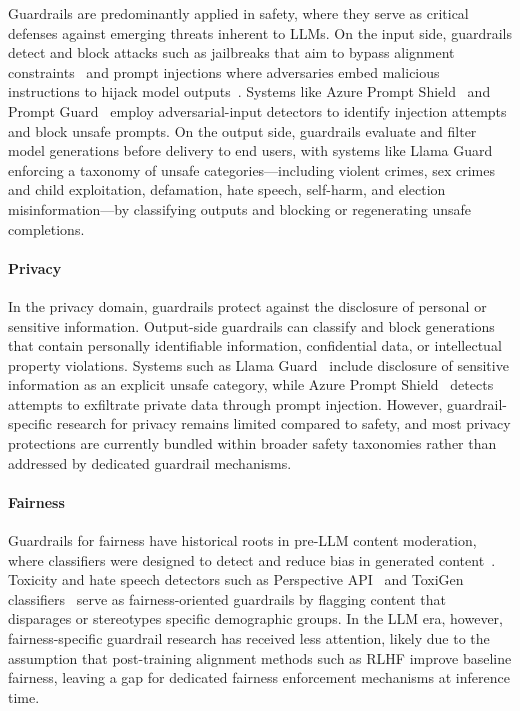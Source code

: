Guardrails are predominantly applied in safety, where they serve as critical defenses against emerging threats inherent to LLMs. On the input side, guardrails detect and block attacks such as jailbreaks that aim to bypass alignment constraints~\citep{Zou2023UniversalAT, Jiang2024ArtPromptAA} and prompt injections where adversaries embed malicious instructions to hijack model outputs~\citep{hackett2025bypassing, Jiang2023POSTERIA}. Systems like Azure Prompt Shield~\citep{azure2025promptshields} and Prompt Guard~\citep{meta2025promptguard} employ adversarial-input detectors to identify injection attempts and block unsafe prompts. On the output side, guardrails evaluate and filter model generations before delivery to end users, with systems like Llama Guard~\citep{Chi2024LlamaG3} enforcing a taxonomy of unsafe categories---including violent crimes, sex crimes and child exploitation, defamation, hate speech, self-harm, and election misinformation---by classifying outputs and blocking or regenerating unsafe completions.

\paragraph{Privacy}

In the privacy domain, guardrails protect against the disclosure of personal or sensitive information. Output-side guardrails can classify and block generations that contain personally identifiable information, confidential data, or intellectual property violations. Systems such as Llama Guard~\citep{Chi2024LlamaG3} include disclosure of sensitive information as an explicit unsafe category, while Azure Prompt Shield~\citep{azure2025promptshields} detects attempts to exfiltrate private data through prompt injection. However, guardrail-specific research for privacy remains limited compared to safety, and most privacy protections are currently bundled within broader safety taxonomies rather than addressed by dedicated guardrail mechanisms.

\paragraph{Fairness}

Guardrails for fairness have historical roots in pre-LLM content moderation, where classifiers were designed to detect and reduce bias in generated content~\citep{Borkan2019NuancedMF, Mathew2020HateXplainAB}. Toxicity and hate speech detectors such as Perspective API~\citep{Lees2022ANG} and ToxiGen classifiers~\citep{Hartvigsen2022ToxiGenAL} serve as fairness-oriented guardrails by flagging content that disparages or stereotypes specific demographic groups. In the LLM era, however, fairness-specific guardrail research has received less attention, likely due to the assumption that post-training alignment methods such as RLHF improve baseline fairness, leaving a gap for dedicated fairness enforcement mechanisms at inference time.


